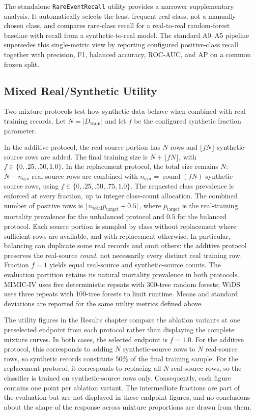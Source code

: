The standalone \texttt{RareEventRecall} utility provides a narrower
supplementary analysis. It automatically selects the least frequent real class,
not a manually chosen class, and compares rare-class recall for a real-to-real
random-forest baseline with recall from a synthetic-to-real model. The standard
A0--A5 pipeline supersedes this single-metric view by reporting configured
positive-class recall together with precision, F1, balanced accuracy, ROC-AUC,
and AP on a common frozen split.

\subsection{Mixed Real/Synthetic Utility}
\label{subsec:mixed_utility_evaluation}

Two mixture protocols test how synthetic data behave when combined with real
training records. Let $N=|D_{\mathrm{train}}|$ and let $f$ be the configured
synthetic fraction parameter.

In the additive protocol, the real-source portion has $N$ rows and
$\lfloor fN\rfloor$ synthetic-source rows are added. The final training size
is $N+\lfloor fN\rfloor$, with
$f\in\{0,.25,.50,1.0\}$. In the replacement protocol, the total size remains
$N$: $N-n_{\mathrm{syn}}$ real-source rows are combined with
$n_{\mathrm{syn}}=\operatorname{round}(fN)$ synthetic-source rows, using
$f\in\{0,.25,.50,.75,1.0\}$. The requested class prevalence is enforced at
every fraction, up to integer class-count allocation. The combined number of
positive rows is $\lfloor n_{\mathrm{total}}p_{\mathrm{target}}+0.5\rfloor$,
where $p_{\mathrm{target}}$ is the real-training mortality prevalence for the
unbalanced protocol and $0.5$ for the balanced protocol. Each source portion
is sampled by class without replacement where sufficient rows are available,
and with replacement otherwise. In particular, balancing can duplicate some
real records and omit others: the additive protocol preserves the real-source
\emph{count}, not necessarily every distinct real training row. Fraction
$f=1$ yields equal real-source and synthetic-source counts. The evaluation
partition retains its natural mortality prevalence in both protocols.
MIMIC-IV uses five deterministic repeats with 300-tree random
forests; WiDS uses three repeats with 100-tree forests to limit runtime. Means
and standard deviations are reported for the same utility metrics defined
above.

The utility figures in the Results chapter compare the ablation variants at one preselected endpoint from each protocol rather than displaying the complete mixture curves. In both cases, the selected endpoint is $f=1.0$. For the additive protocol, this corresponds to adding $N$ synthetic-source rows to $N$ real-source rows, so synthetic records constitute 50\% of the final training sample. For the replacement protocol, it corresponds to replacing all $N$ real-source rows, so the classifier is trained on synthetic-source rows only. Consequently, each figure contains one point per ablation variant. The intermediate fractions are part of the evaluation but are not displayed in these endpoint figures, and no conclusions about the shape of the response across mixture proportions are drawn from them.

